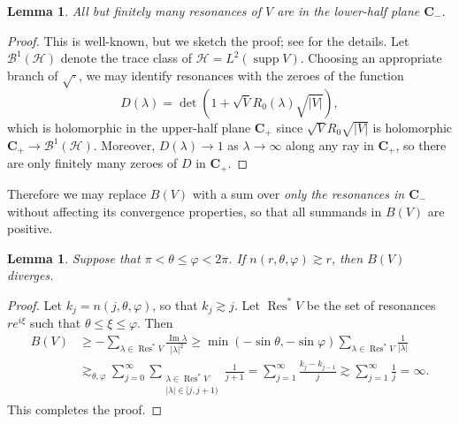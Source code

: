 \documentclass[reqno,12pt,letterpaper]{amsart}
\newcommand{\CC}{\mathbf{C}}
\DeclareMathOperator{\Res}{Res}
\DeclareMathOperator{\sgn}{sgn}
\DeclareMathOperator{\supp}{supp}
\renewcommand{\Im}{\operatorname{Im}}
\newtheorem{lemma}[theorem]{Lemma}
\theoremstyle{definition}
\begin{document}
\begin{lemma}
All but finitely many resonances of $V$ are in the lower-half plane $\CC_-$.
\end{lemma}
\begin{proof}
This is well-known, but we sketch the proof; see \cite[\S3]{froese1997asymptotic} for the details.
Let $\mathcal B^1(\mathcal H)$ denote the trace class of $\mathcal H = L^2(\supp V)$. Choosing an appropriate branch of $\sqrt\cdot$, we may identify resonances with the zeroes of the function
$$D(\lambda) = \det(1 + \sqrt V R_0(\lambda) \sqrt{|V|}),$$
which is holomorphic in the upper-half plane $\CC_+$ since $\sqrt V R_0 \sqrt{|V|}$ is holomorphic $\CC_+ \to \mathcal B^1(\mathcal H)$. Moreover, $D(\lambda) \to 1$ as $\lambda \to \infty$ along any ray in $\CC_+$,
so there are only finitely many zeroes of $D$ in $\CC_+$.
\end{proof}
Therefore we may replace $B(V)$ with a sum over \emph{only the resonances in $\CC_-$} without affecting its convergence properties, so that all summands in $B(V)$ are positive.

\begin{lemma}
\label{divergence of angular series}
Suppose that $\pi < \theta \leq \varphi < 2\pi$. If $n(r, \theta, \varphi) \gtrsim r$, then $B(V)$ diverges.
\end{lemma}
\begin{proof}
Let $k_j = n(j, \theta, \varphi)$, so that $k_j \gtrsim j$.
Let $\Res^* V$ be the set of resonances $re^{i\xi}$ such that $\theta \leq \xi \leq \varphi$. Then
\begin{align*}
B(V) &\geq -\sum_{\lambda \in \Res^* V} \frac{\Im \lambda}{|\lambda|^2}  \geq \min(-\sin \theta, -\sin \varphi) \sum_{\lambda \in \Res^* V} \frac{1}{|\lambda|}\\%
  & \gtrsim_{\theta,\varphi} \sum_{j=0}^\infty \sum_{\substack{\lambda \in \Res^* V\\|\lambda| \in [j, j+1)}} \frac{1}{j+1}
  = \sum_{j=1}^\infty \frac{k_j - k_{j-1}}{j} \gtrsim \sum_{j=1}^\infty \frac{1}{j} = \infty.
\end{align*}
This completes the proof.
\end{proof}

\end{document}
